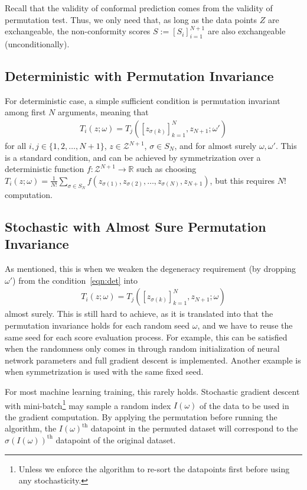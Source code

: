\documentclass{article}
\newcommand{\cc}[1]{\left[ #1 \right]}
\begin{document}
    Recall that the validity of conformal prediction comes from the validity of permutation test. Thus, we only need that, as long as the data points $Z$ are exchangeable,
    the non-conformity scores $S := \cc{S_i}_{i=1}^{N+1}$ are also exchangeable (unconditionally). 

    \subsection{Deterministic with Permutation Invariance}
    \label{subsection:deterministic}

    For deterministic case, a simple sufficient condition is permutation invariant among first $N$ arguments, meaning that
    \begin{align}
    \label{eqn:det}
        T_i(z;\omega) = T_j(\cc{z_{\sigma(k)}}_{k=1}^N, z_{N+1}; \omega')
    \end{align}
    for all $i,j \in \{1,2,\dots, N+1\}$, $z \in \mathcal{Z}^{N+1}$, $\sigma \in S_N$, and for almost surely $\omega, \omega'$. This is a standard condition, and can be achieved by symmetrization over a deterministic function $f: \mathcal{Z}^{N+1} \to \mathbb{R}$ such as choosing $T_i(z;\omega) = \frac{1}{N!} \sum_{\sigma \in S_N} f\left(z_{\sigma(1)}, z_{\sigma(2)}, \dots, z_{\sigma(N)}, z_{N+1}\right)$, but this requires $N!$ computation.

    \subsection{Stochastic with Almost Sure Permutation Invariance}
    \label{subsection:almostsure}
    As mentioned, this is when we weaken the degeneracy requirement (by dropping $\omega'$) from the condition~\ref{eqn:det} into
    \begin{align}
    \label{eqn:ass}
        T_i(z;\omega) = T_j(\cc{z_{\sigma(k)}}_{k=1}^N, z_{N+1}; \omega)
    \end{align}
    almost surely. This is still hard to achieve, as it is translated into that the permutation invariance holds for each random seed $\omega$, and we have to reuse the same seed for each score evaluation process. For example, this can be satisfied when the randomness only comes in through random initialization of neural network parameters and full gradient descent is implemented. Another example is when symmetrization is used with the same fixed seed.
    
    For most machine learning training, this rarely holds. Stochastic gradient descent with mini-batch\footnote{Unless we enforce the algorithm to re-sort the datapoints first before using any stochasticity.} may sample a random index $I(\omega)$ of the data to be used in the gradient computation. By applying the permutation before running the algorithm, the $I(\omega)^{\text{th}}$ datapoint in the permuted dataset will correspond to the $\sigma\left(I(\omega)\right)^{\text{th}}$ datapoint of the original dataset.
\end{document}

